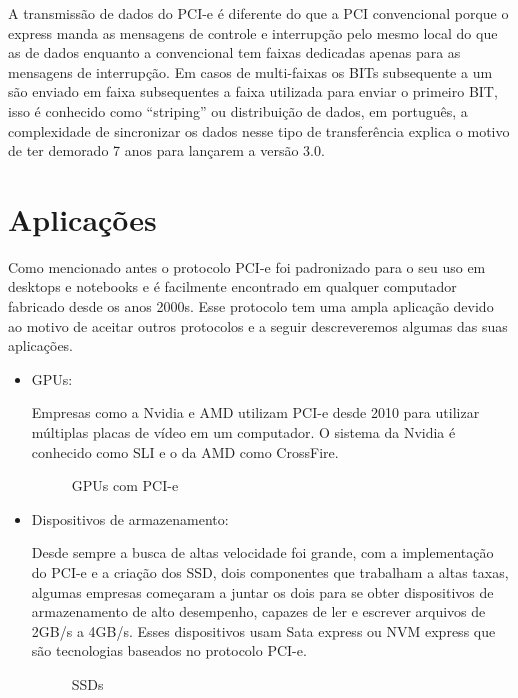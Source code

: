 \documentclass{article}
\begin{document}
        A transmissão de dados do PCI-e é diferente do que a PCI convencional porque o express manda as mensagens de controle e interrupção pelo mesmo local do que as de dados enquanto a convencional tem faixas dedicadas apenas para as mensagens de interrupção. Em casos de multi-faixas os BITs subsequente a um são enviado em faixa subsequentes a faixa utilizada para enviar o primeiro BIT, isso é conhecido como “striping” ou distribuição de dados, em português, a complexidade de sincronizar os dados nesse tipo de transferência explica o motivo de ter demorado 7 anos para lançarem a versão 3.0.
        
    \section{Aplicações}
        Como mencionado antes o protocolo PCI-e foi padronizado para o seu uso em desktops e notebooks e é facilmente encontrado em qualquer computador fabricado desde os anos 2000s. Esse protocolo tem uma ampla aplicação devido ao motivo de aceitar outros protocolos e a seguir descreveremos algumas das suas aplicações.
        \begin{itemize}
            \item 
                GPUs:
                
                    Empresas como a Nvidia e AMD utilizam PCI-e desde 2010 para utilizar múltiplas placas de vídeo em um computador. O sistema da Nvidia é conhecido como SLI e o da AMD como CrossFire.
                    \begin{figure}[H]
                        \centering
                        \caption{GPUs com PCI-e}
                        \label{fig:GPUs}
                    \end{figure}
            \item
                Dispositivos de armazenamento:
                    
                    Desde sempre a busca de altas velocidade foi grande, com a implementação do PCI-e e a criação dos SSD, dois componentes que trabalham a altas taxas, algumas empresas começaram a juntar os dois para se obter dispositivos de armazenamento de alto desempenho, capazes de ler e escrever arquivos de 2GB/s a 4GB/s. Esses dispositivos usam Sata express ou NVM express que são tecnologias baseados no protocolo PCI-e.
                    \begin{figure}[H]
                        \centering
                        \caption{SSDs}
                        \label{fig:SSDs}
                    \end{figure}
        \end{itemize}
\end{document}
